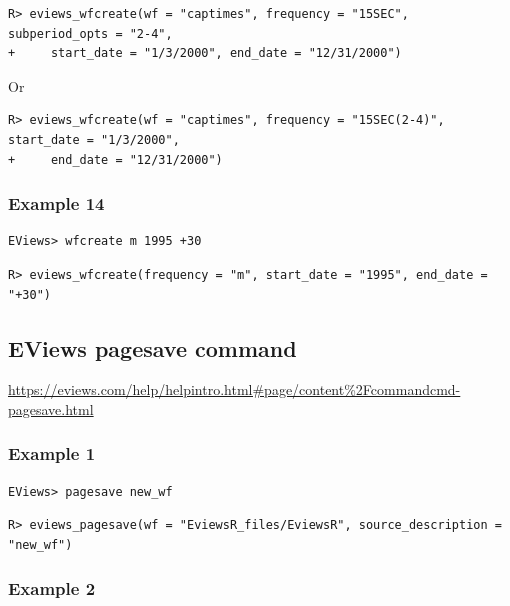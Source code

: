 \begin{verbatim}
R> eviews_wfcreate(wf = "captimes", frequency = "15SEC", subperiod_opts = "2-4",
+     start_date = "1/3/2000", end_date = "12/31/2000")
\end{verbatim}

Or

\begin{verbatim}
R> eviews_wfcreate(wf = "captimes", frequency = "15SEC(2-4)", start_date = "1/3/2000",
+     end_date = "12/31/2000")
\end{verbatim}

\hypertarget{example-14-1}{%
\subsubsection{Example 14}\label{example-14-1}}

\begin{verbatim}
EViews> wfcreate m 1995 +30
\end{verbatim}

\begin{verbatim}
R> eviews_wfcreate(frequency = "m", start_date = "1995", end_date = "+30")
\end{verbatim}

\hypertarget{eviews-pagesave-command}{%
\subsection{EViews pagesave command}\label{eviews-pagesave-command}}

\url{https://eviews.com/help/helpintro.html\#page/content\%2Fcommandcmd-pagesave.html}

\hypertarget{example-1-3}{%
\subsubsection{Example 1}\label{example-1-3}}

\begin{verbatim}
EViews> pagesave new_wf
\end{verbatim}

\begin{verbatim}
R> eviews_pagesave(wf = "EviewsR_files/EviewsR", source_description = "new_wf")
\end{verbatim}

\hypertarget{example-2-3}{%
\subsubsection{Example 2}\label{example-2-3}}


